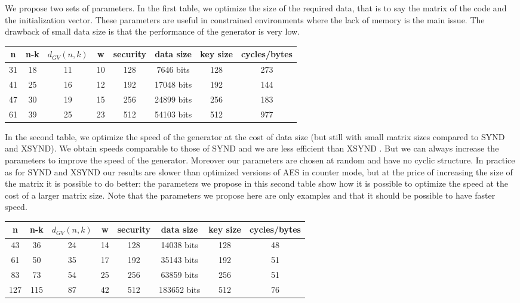 \documentclass[11pt, a4paper]{llncs}
\begin{document}
We propose two sets of parameters. In the first table, we optimize the size of the required data, that is to say the matrix of the code and the initialization vector. These parameters are useful in constrained environments where the lack of memory is the main issue. The drawback of small data size is that the performance of the generator is very low.

\begin{center}

\begin{tabular}{|c|c|c|c|c|c|c|c|}
\hline
n & n-k & $d_{GV}(n,k)$ & w & security & data size & key size & cycles/bytes\\
\hline
31 & 18 & 11 & 10 & 128 & 7646 bits & 128 & 273\\
\hline
41 & 25 & 16 & 12 & 192 & 17048 bits & 192 & 144\\
\hline
47 & 30 & 19 & 15 & 256 & 24899 bits& 256 & 183\\
\hline
61 & 39& 25 & 23 & 512 & 54103 bits&512 & 977\\
\hline
\end{tabular}\label{tab1}
\end{center}
In the second table, we optimize the speed of the generator at the cost of data size (but still with small
matrix sizes compared to SYND and XSYND). We obtain speeds comparable to those of SYND \cite{GLS07} and we are less efficient than XSYND \cite{MHC12}. But we can always increase the parameters to improve the speed of the generator. Moreover our parameters are chosen at random and have no cyclic structure. In practice as for SYND and XSYND our results are slower than optimized versions of AES in counter mode, but at the price of increasing the size of the matrix it is possible to do better: the parameters we
propose in this second table show how it is possible to optimize the speed at the cost of a larger matrix size.
Note that the parameters we propose here are only examples and that it should be possible to have faster speed.


\begin{center}
\begin{tabular}{|c|c|c|c|c|c|c|c|}
\hline
n & n-k & $d_{GV}(n,k)$ & w & security & data size & key size & cycles/bytes\\
\hline
43 & 36 & 24& 14& 128 & 14038 bits& 128 &48\\
\hline
61 & 50 &35 &17 &192 &35143 bits&192 &51\\
\hline
83 & 73 & 54 &25 &256 &63859 bits& 256 &51 \\
\hline
127 &115 & 87 &42 &512 &183652 bits&512 &76\\
\hline
\end{tabular}\label{tab2}

\end{center}
\end{document}

